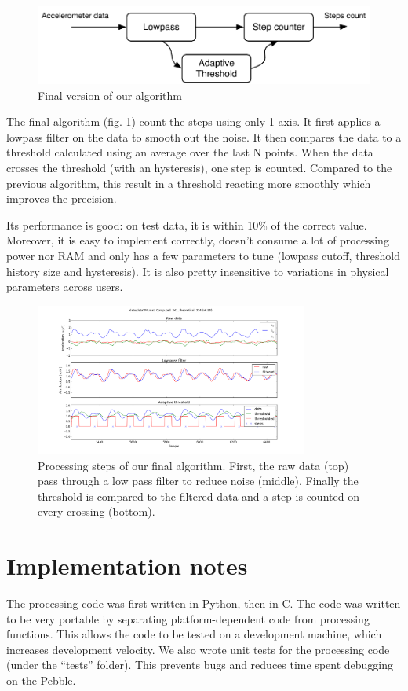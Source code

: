 \documentclass[12pt,twoside,a4paper]{article}
\begin{document}
\begin{figure}[h]
    \centering
    \includegraphics{algorithm}
    \caption{Final version of our algorithm}
    \label{fig:algorithm}
\end{figure}

The final algorithm (fig. \ref{fig:algorithm}) count the steps using only 1 axis.
It first applies a lowpass filter on the data to smooth out the noise.
It then compares the data to a threshold calculated using an average over the last N points.
When the data crosses the threshold (with an hysteresis), one step is counted.
Compared to the previous algorithm, this result in a threshold reacting more smoothly which improves the precision.

Its performance is good: on test data, it is within 10\% of the correct value.
Moreover, it is easy to implement correctly, doesn't consume a lot of processing power nor RAM and only has a few parameters to tune (lowpass cutoff, threshold history size and hysteresis).
It is also pretty insensitive to variations in physical parameters across users.

\begin{figure}[h]
    \centering
    \includegraphics[width=0.8\textwidth]{algorithm_steps}
    \caption{Processing steps of our final algorithm.
        First, the raw data (top) pass through a low pass filter to reduce noise (middle).
        Finally the threshold is compared to the filtered data and a step is counted on every crossing (bottom).
    }
    \label{fig:steps}
\end{figure}

\section{Implementation notes}
The processing code was first written in Python, then in C.
The code was written to be very portable by separating platform-dependent code from processing functions.
This allows the code to be tested on a development machine, which increases development velocity.
We also wrote unit tests for the processing code (under the ``tests'' folder).
This prevents bugs and reduces time spent debugging on the Pebble.
\end{document}
